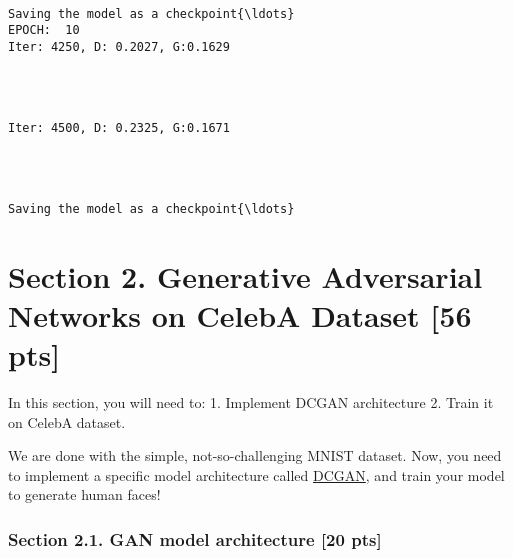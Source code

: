 \documentclass[11pt]{article}
\begin{document}
    \begin{Verbatim}[commandchars=\\\{\}]

Saving the model as a checkpoint{\ldots}
EPOCH:  10
Iter: 4250, D: 0.2027, G:0.1629
    \end{Verbatim}

    \begin{center}
    \end{center}
    { \hspace*{\fill} \\}
    
    \begin{Verbatim}[commandchars=\\\{\}]

Iter: 4500, D: 0.2325, G:0.1671
    \end{Verbatim}

    \begin{center}
    \end{center}
    { \hspace*{\fill} \\}
    
    \begin{Verbatim}[commandchars=\\\{\}]

Saving the model as a checkpoint{\ldots}
    \end{Verbatim}

    \hypertarget{section-2.-generative-adversarial-networks-on-celeba-dataset-56-pts}{%
\section{Section 2. Generative Adversarial Networks on CelebA Dataset
{[}56
pts{]}}\label{section-2.-generative-adversarial-networks-on-celeba-dataset-56-pts}}

In this section, you will need to: 1. Implement DCGAN architecture 2.
Train it on CelebA dataset.

We are done with the simple, not-so-challenging MNIST dataset. Now, you
need to implement a specific model architecture called
\href{https://arxiv.org/pdf/1511.06434.pdf}{DCGAN}, and train your model
to generate human faces!

    \hypertarget{section-2.1.-gan-model-architecture-20-pts}{%
\subsubsection{Section 2.1. GAN model architecture {[}20
pts{]}}\label{section-2.1.-gan-model-architecture-20-pts}}
\end{document}
